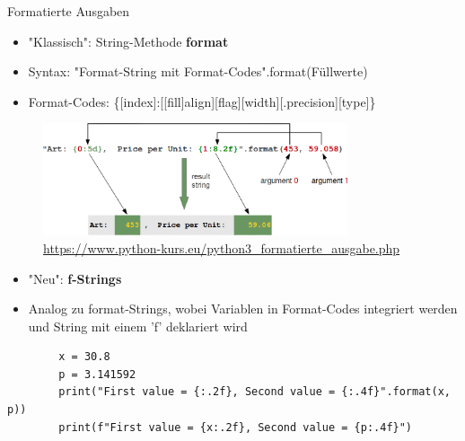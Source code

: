 \documentclass[utf8, smaller, c]{beamer}
\begin{document}
\begin{frame}{Formatierte Ausgaben}
	
	\pagebreak
	
	\vspace*{-2mm}
	\begin{itemize}
		\item "Klassisch": String-Methode \textbf{format}
		\item Syntax: "Format-String mit Format-Codes".format(Füllwerte)
		\item Format-Codes: \{[index]:[[fill]align][flag][width][.precision][type]\}
	\end{itemize}
	\begin{figure}[hb]
		\centering
		\includegraphics[width=0.8\textwidth]{pics/formatierte_ausgabe2.png}
		{\tiny\url{https://www.python-kurs.eu/python3_formatierte_ausgabe.php}}
	\end{figure}
	
	\pagebreak
	
	\vspace*{-2mm}
	\begin{itemize}
		\item "Neu": \textbf{f-Strings}
		\item Analog zu format-Strings, wobei Variablen in Format-Codes integriert werden und String mit einem 'f' deklariert wird
	\end{itemize}
	\begin{lstlisting}
		x = 30.8
		p = 3.141592
		print("First value = {:.2f}, Second value = {:.4f}".format(x, p))
		print(f"First value = {x:.2f}, Second value = {p:.4f}")
	\end{lstlisting}
	
	\pagebreak
	

\end{frame}
\end{document}
